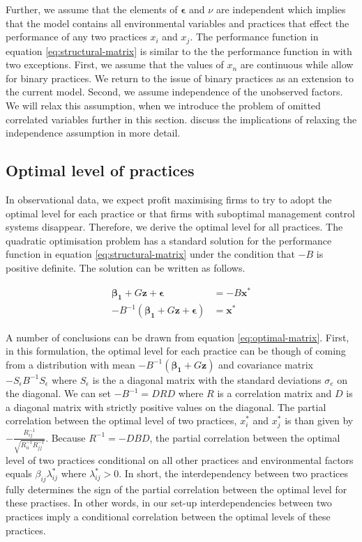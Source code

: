 \documentclass[12pt]{article}
\begin{document}
Further, we assume that the elements of $\mathbf{\epsilon}$ and $\nu$ are independent which implies that the model contains all environmental variables and practices that effect the performance of any two practices $x_i$ and $x_j$. The performance function in equation \eqref{eq:structural-matrix} is similar to the the performance function in \citet{Kretschmer2012} with two exceptions. First, we assume that the values of $x_n$ are continuous while \citet{Kretschmer2012} allow for binary practices. We return to the issue of binary practices as an extension to the current model. Second, we assume independence of the unobserved factors. We will relax this assumption, when we introduce the problem of omitted correlated variables further in this section. \citet{Athey1998} discuss the implications of relaxing the independence assumption in more detail. 

\subsection{Optimal level of practices}

In observational data, we expect profit maximising firms to try to adopt the optimal level for each practice or that firms with suboptimal management control systems disappear. Therefore, we derive the optimal level for all practices. The quadratic optimisation problem has a standard solution for the performance function in equation \eqref{eq:structural-matrix} under the condition that $-B$ is positive definite. The solution can be written as follows.

\begin{equation} \label{eq:optimal-matrix}
\begin{aligned} 
    \mathbf{\beta_1} + G \mathbf{z} + \mathbf{\epsilon} & = -B \mathbf{x^*} \\
    - B^{-1} (\mathbf{\beta_1} +  G \mathbf{z} + \mathbf{\epsilon})  & = \mathbf{x^*}
\end{aligned}
\end{equation}

A number of conclusions can be drawn from equation \eqref{eq:optimal-matrix}. First, in this formulation, the optimal level for each practice can be though of coming from a distribution with mean $-B^{-1} (\mathbf{\beta_1} + G \mathbf{z})$ and covariance matrix $-S_{\epsilon} B^{-1} S_{\epsilon}$ where $S_{\epsilon}$ is the a diagonal matrix with the standard deviations $\sigma_e$ on the diagonal. We can set $-B^{-1} = DRD$ where $R$ is a correlation matrix and $D$ is a diagonal matrix with strictly positive values on the diagonal. The partial correlation between the optimal level of two practices, $x^*_i$ and $x^*_j$ is than given by $-\frac{R^{-1}_{ij}}{\sqrt{R^{-1}_{ii} R^{-1}_{jj}}}$. Because $R^{-1} = - DBD$, the partial correlation between the optimal level of two practices conditional on all other practices and environmental factors equals $\beta_{ij}\lambda_{ij}^*$ where $\lambda_{ij}^* > 0$. In short, the interdependency between two practices fully determines the sign of the partial correlation between the optimal level for these practises. In other words, in our set-up interdependencies between two practices imply a conditional correlation between the optimal levels of these practices. 
\end{document}
